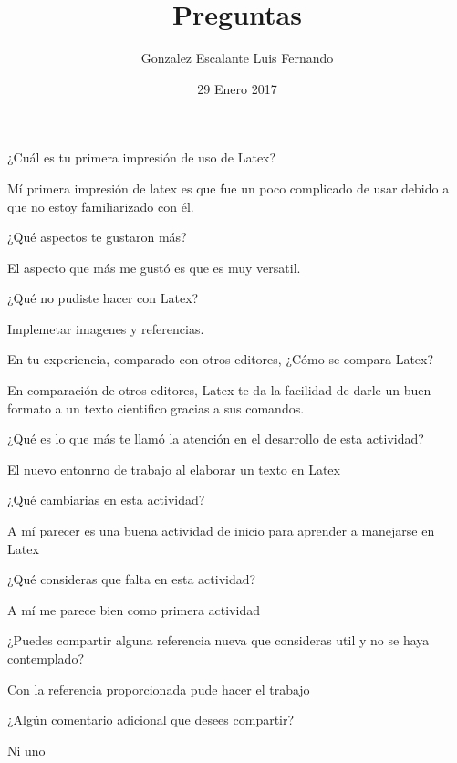 \documentclass[11pt,a4paper]{report}
\begin{document}
\author{Gonzalez Escalante Luis Fernando}
\date{29 Enero 2017}
\title{Preguntas}
\maketitle
¿Cuál es tu primera impresión de uso de Latex?

Mí primera impresión de latex es que fue un poco complicado de usar debido a que no estoy familiarizado con él.

¿Qué aspectos te gustaron más?

El aspecto que más me gustó es que es muy versatil.

¿Qué no pudiste hacer con Latex?

Implemetar imagenes y referencias.

En tu experiencia, comparado con otros editores, ¿Cómo se compara Latex?

En comparación de otros editores, Latex te da la facilidad de darle un buen formato a un texto cientifico gracias a sus comandos.

¿Qué es lo que más te llamó la atención en el desarrollo de esta actividad?

El nuevo entonrno de trabajo al elaborar un texto en Latex

¿Qué cambiarias en esta actividad?

A mí parecer es una buena actividad de inicio para aprender a manejarse en Latex

¿Qué consideras que falta en esta actividad?

A mí me parece bien como primera actividad

¿Puedes compartir alguna referencia nueva que consideras util y no se haya contemplado?

Con la referencia proporcionada pude hacer el trabajo

¿Algún comentario adicional que desees compartir?

Ni uno
\end{document}
